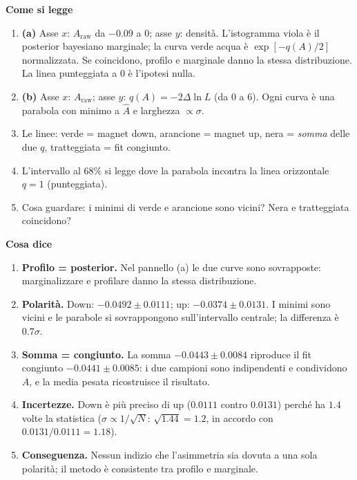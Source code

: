 \documentclass[10.5pt,a4paper]{article}
\newcommand{\Araw}{A_{\mathrm{raw}}}
\newcommand{\sez}[1]{\par\Needspace{6\baselineskip}\medskip\noindent\textbf{\large #1}\par\nopagebreak\smallskip}
\begin{document}
\sez{Come si legge}
\begin{enumerate}
\item \textbf{(a)} Asse $x$: $\Araw$ da $-0.09$ a $0$; asse $y$: densità. L'istogramma viola è il posterior bayesiano marginale; la curva verde acqua è $\exp[-q(A)/2]$ normalizzata. Se coincidono, profilo e marginale danno la stessa distribuzione. La linea punteggiata a $0$ è l'ipotesi nulla.
\item \textbf{(b)} Asse $x$: $\Araw$; asse $y$: $q(A)=-2\Delta\ln L$ (da $0$ a $6$). Ogni curva è una parabola con minimo a $\hat A$ e larghezza $\propto\sigma$.
\item Le linee: verde = magnet down, arancione = magnet up, nera = \emph{somma} delle due $q$, tratteggiata = fit congiunto.
\item L'intervallo al $68\%$ si legge dove la parabola incontra la linea orizzontale $q=1$ (punteggiata).
\item Cosa guardare: i minimi di verde e arancione sono vicini? Nera e tratteggiata coincidono?
\end{enumerate}

\sez{Cosa dice}
\begin{enumerate}
\item \textbf{Profilo = posterior.} Nel pannello (a) le due curve sono sovrapposte: marginalizzare e profilare danno la stessa distribuzione.
\item \textbf{Polarità.} Down: $-0.0492\pm0.0111$; up: $-0.0374\pm0.0131$. I minimi sono vicini e le parabole si sovrappongono sull'intervallo centrale; la differenza è $0.7\sigma$.
\item \textbf{Somma = congiunto.} La somma $-0.0443\pm0.0084$ riproduce il fit congiunto $-0.0441\pm0.0085$: i due campioni sono indipendenti e condividono $A$, e la media pesata ricostruisce il risultato.
\item \textbf{Incertezze.} Down è più preciso di up ($0.0111$ contro $0.0131$) perché ha $1.4$ volte la statistica ($\sigma\propto1/\sqrt N$: $\sqrt{1.44}=1.2$, in accordo con $0.0131/0.0111=1.18$).
\item \textbf{Conseguenza.} Nessun indizio che l'asimmetria sia dovuta a una sola polarità; il metodo è consistente tra profilo e marginale.
\end{enumerate}
\end{document}
